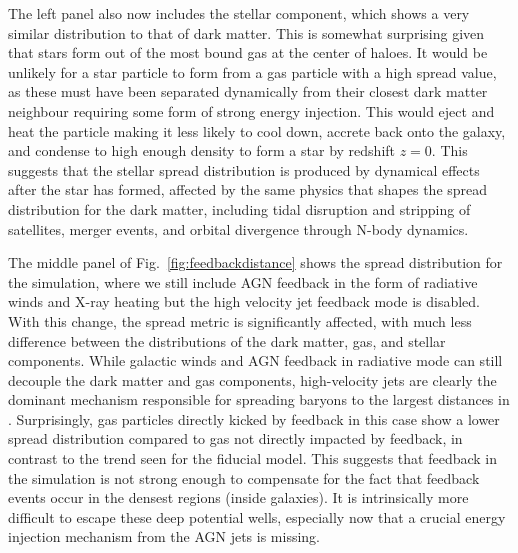 The left panel also now includes the stellar component, which shows a very
similar distribution to that of dark matter. This is somewhat surprising
given that stars form out of the most bound gas at the center of haloes. It
would be unlikely for a star particle to form from a gas particle with a high
spread value, as these must have been separated dynamically from their
closest dark matter neighbour requiring some form of strong energy injection.
This would eject and heat the particle making it less likely to cool down,
accrete back onto the galaxy, and condense to high enough density to form a
star by redshift $z = 0$. This suggests that the stellar spread distribution
is produced by dynamical effects after the star has formed, affected by the
same physics that shapes the spread distribution for the dark matter,
including tidal disruption and stripping of satellites, merger events, and
orbital divergence through N-body dynamics.

The middle panel of Fig.~\ref{fig:feedbackdistance} shows the spread
distribution for the \nojet{} simulation, where we still include AGN feedback
in the form of radiative winds and X-ray heating but the high velocity jet
feedback mode is disabled. With this change, the spread metric is
significantly affected, with much less difference between the distributions
of the dark matter, gas, and stellar components. While galactic winds and AGN
feedback in radiative mode can still decouple the dark matter and gas
components, high-velocity jets are clearly the dominant mechanism responsible
for spreading baryons to the largest distances in \simba{}. Surprisingly, gas
particles directly kicked by feedback in this case show a lower spread
distribution compared to gas not directly impacted by feedback, in contrast
to the trend seen for the fiducial \simba{} model. This suggests that
feedback in the \nojet{} simulation is not strong enough to compensate for the
fact that feedback events occur in the densest regions (inside galaxies). It is
intrinsically more difficult to escape these deep potential wells, especially
now that a crucial energy injection mechanism from the AGN jets is missing.


